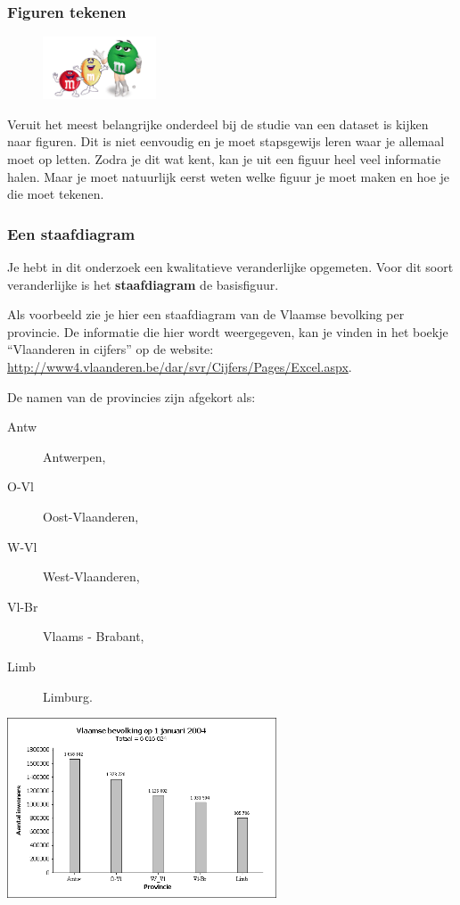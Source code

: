 \documentclass[11pt]{article}
\begin{document}
\subsubsection{Figuren tekenen}

\begin{figure}
  \vspace{-0.5cm}
  \includegraphics[width=0.3\textwidth]{MenM-fun.png}
\end{figure}

Veruit het meest belangrijke onderdeel bij de studie van een
dataset is kijken naar figuren. Dit is niet eenvoudig en je
moet stapsgewijs leren waar je allemaal moet op letten.
Zodra je dit wat kent, kan je uit een figuur heel veel
informatie halen. Maar je moet natuurlijk eerst weten welke
figuur je moet maken en hoe je die moet tekenen.

\subsubsection*{Een staafdiagram}

Je hebt in dit onderzoek een kwalitatieve veranderlijke opgemeten. Voor dit soort
veranderlijke is het {\bf staafdiagram} de basisfiguur.

Als voorbeeld zie je hier een staafdiagram
van de Vlaamse bevolking per provincie. De
informatie die hier wordt weergegeven, kan
je vinden in het boekje “Vlaanderen in
cijfers” op de website:
\url{http://www4.vlaanderen.be/dar/svr/Cijfers/Pages/Excel.aspx}.

  
\begin{minipage}{0.5\textwidth}
De namen van de provincies zijn afgekort als:
  \begin{description}
    \item[Antw] Antwerpen,
    \item[O-Vl] Oost-Vlaanderen,
    \item[W-Vl] West-Vlaanderen,
    \item[Vl-Br] Vlaams - Brabant,
    \item[Limb] Limburg.
  \end{description}
\end{minipage}
\begin{minipage}{0.5\textwidth}
%  
  \includegraphics[width=8cm]{vlaamse_bevolking.png}
\end{minipage}
\end{document}
